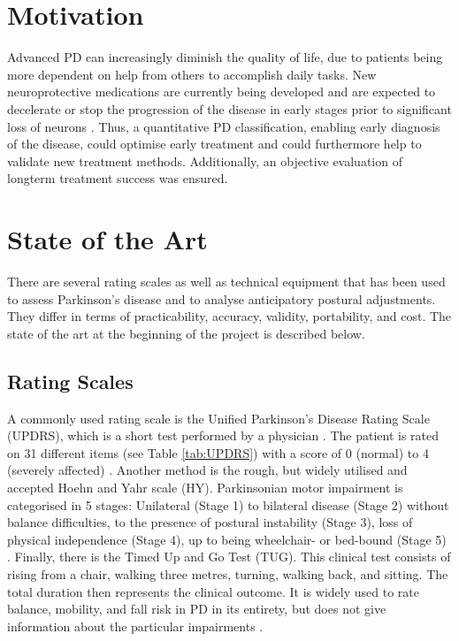 \section{Motivation}

Advanced PD can increasingly diminish the quality of life, due to patients being more dependent on help from others to accomplish daily tasks. New neuroprotective medications are currently being developed and are expected to decelerate or stop the progression of the disease in early stages prior to significant loss of neurons \cite{botzel_motivation_2014}\cite{mancini_isway:_2012}. Thus, a quantitative PD classification, enabling early diagnosis of the disease, could optimise early treatment and could furthermore help to validate new treatment methods. Additionally, an objective evaluation of longterm treatment success was ensured.


\section{State of the Art}

There are several rating scales as well as technical equipment that has been used to assess Parkinson's disease and to analyse anticipatory postural adjustments.  They differ in terms of practicability, accuracy, validity, portability, and cost. The state of the art at the beginning of the project is described below.

\subsection{Rating Scales}

A commonly used rating scale is the Unified Parkinson’s Disease Rating Scale (UPDRS), which is a short test performed by a physician \cite{klerk_long-term_2009}. The patient is rated on 31 different items (see Table \ref{tab:UPDRS}) with a score of 0 (normal) to 4 (severely affected) \cite{herndon_handbook_2006}. Another method is the rough, but widely utilised and accepted Hoehn and Yahr scale (HY). Parkinsonian motor impairment is categorised in 5 stages: Unilateral (Stage 1) to bilateral disease (Stage 2) without balance difficulties, to the presence of postural instability (Stage 3), loss of physical independence (Stage 4), up to being wheelchair- or bed-bound (Stage 5) \cite{goetz_movement_2004}. Finally, there is the Timed Up and Go Test (TUG). This clinical test consists of rising from a chair, walking three metres, turning, walking back, and sitting. The total duration then represents the clinical outcome. It is widely used to rate balance, mobility, and fall risk in PD in its entirety, but does not give information about the particular impairments \cite{palmerini_quantification_2013}.

